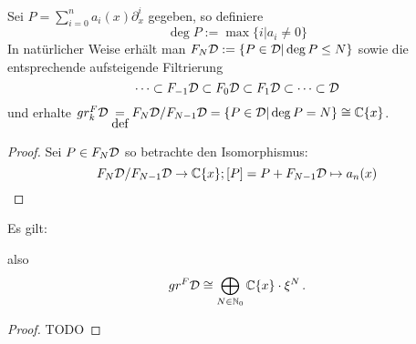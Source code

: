 

\begin{defn}
Sei $P=\sum_{i=0}^na_i(x)\partial_x^i$ gegeben, so definiere 
\[
\deg P:=\max\{i|a_i\neq 0\}
\]
In natürlicher Weise erhält man $F_N\mathcal{D}:=\{P\in\mathcal{D}|\deg P\leq N\}$ sowie die
entsprechende aufsteigende Filtrierung
\[
\cdots\subset F_{-1}\mathcal{D}\subset F_{0}\mathcal{D}\subset
F_{1}\mathcal{D}\subset\cdots\subset\mathcal{D}
\]
und erhalte $gr_k^F\mathcal{D}\underset{\mbox{def}}{=}F_N\mathcal{D}\slash F_{N-1}\mathcal{D}
=\{P\in\mathcal{D}|\deg P=N\}\cong\mathbb{C}\{x\}$.
\end{defn}

\begin{proof}
Sei $P\in F_N\mathcal{D}$ so betrachte den Isomorphismus:
\[
F_N\mathcal{D}\slash F_{N-1}\mathcal{D}\rightarrow \mathbb{C}\{x\}; [P]=P+F_{N-1}\mathcal{D}\mapsto a_n(x)
\]
\end{proof}

\begin{prop}
Es gilt:
\begin{center}
\end{center}
also
\[ gr^F\mathcal{D} \cong \bigoplus_{N\in\mathbb{N}_0}\mathbb{C}\{x\}\cdot \xi^N \,. \]
\end{prop}
\begin{proof} TODO
\begin{comment}
Treffen?
\end{comment}
\end{proof}

\begin{comment}
\subsection{Weyl Algebra als Graduierter Ring}
Sei $A$ nun einer der drei Koeffizienten Ringe, welche zuvor behandelt
wurden.  Der Ring $A<\partial_x>$ kommt zusammen mit einer aufsteigenden
Filtrierung, welche wir mit $F(A<\partial_x)$ bezeichen werden.  Sei $P$ ein
bzgl. \ref{prop:weyl_eindeutige_schreibung} minimal geschriebener Operator,
so ist $P$ in $F_k$ falls der maximale Grad von $\partial_x$ in $P$ kleiner
oder gleich $k$. So definiere den Grad $deg P$ von $P$ als die Eindeutige
ganze Zahl $k$ mit $P\in F_kA<\partial_x>\slash F_{k-1}<\partial_x>$

Unabhängigkeit von Schreibung wird in Sabbah Script behauptet
\end{comment}

